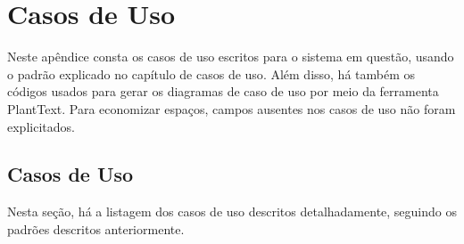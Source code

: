 \chapter{Casos de Uso}\label{chap:use-case-appendix}
Neste apêndice consta os casos de uso escritos para o sistema em questão, usando o padrão explicado no capítulo de casos de uso\cite{ibm2011}. Além disso, há também os códigos usados para gerar os diagramas de caso de uso por meio da ferramenta PlantText. Para economizar espaços, campos ausentes nos casos de uso não foram explicitados.

\section{Casos de Uso}
Nesta seção, há a listagem dos casos de uso descritos detalhadamente, seguindo os padrões descritos anteriormente.

